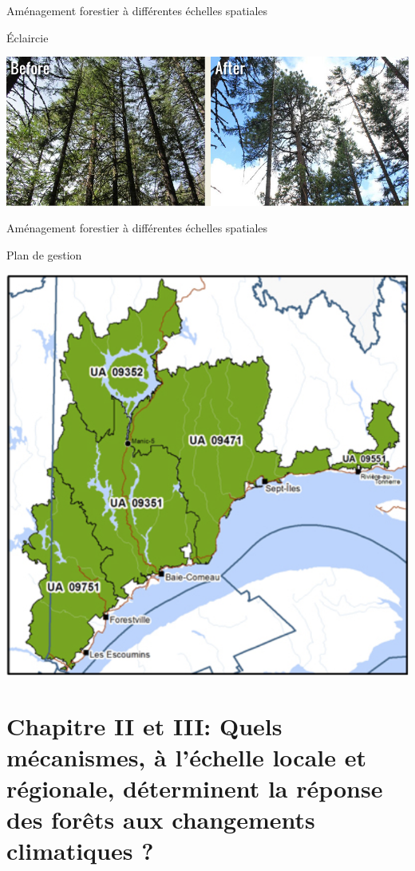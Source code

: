 \documentclass[11pt, compress, aspectratio=1610]{beamer}
\begin{document}
\begin{frame}{Aménagement forestier à différentes échelles spatiales}

Éclaircie

\centering
 \includegraphics[scale=0.338]{figures/thinning}\par

\end{frame}

\begin{frame}{Aménagement forestier à différentes échelles spatiales}

Plan de gestion

\centering
 \includegraphics[scale=0.28]{figures/planGestion}\par

\end{frame}

\section{\texorpdfstring{Chapitre II et III: \newline Quels mécanismes,
à l'échelle locale et régionale, déterminent la réponse des forêts aux
changements climatiques
?}{Chapitre II et III: Quels mécanismes, à l'échelle locale et régionale, déterminent la réponse des forêts aux changements climatiques ?}}\label{chapitre-ii-et-iii-quels-muxe9canismes-uxe0-luxe9chelle-locale-et-ruxe9gionale-duxe9terminent-la-ruxe9ponse-des-foruxeats-aux-changements-climatiques}
\end{document}
